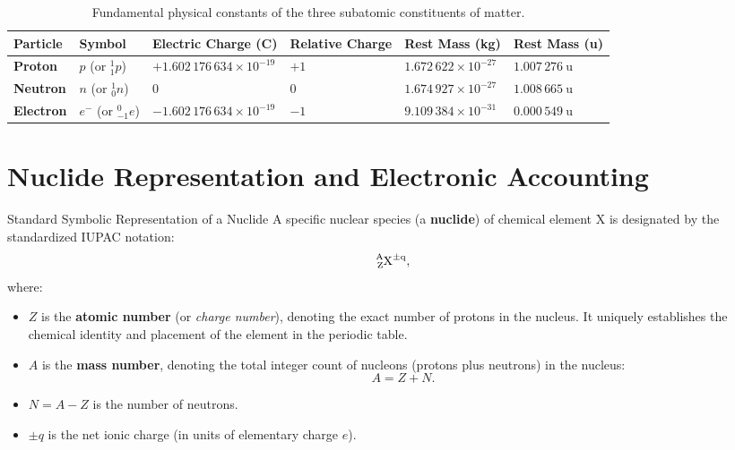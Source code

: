 \begin{table}[htbp]
\centering
\renewcommand{\arraystretch}{1.35}
\begin{tabular}{@{}llllll@{}}
\toprule
\textbf{Particle} & \textbf{Symbol} & \textbf{Electric Charge (C)} & \textbf{Relative Charge} & \textbf{Rest Mass (kg)} & \textbf{Rest Mass (u)} \\
\midrule
\textbf{Proton} & $p$ (or $^1_1p$) & $+1.602\,176\,634 \times 10^{-19}$ & $+1$ & $1.672\,622 \times 10^{-27}$ & $1.007\,276\ \mathrm{u}$ \\
\textbf{Neutron} & $n$ (or $^1_0n$) & $0$ & $0$ & $1.674\,927 \times 10^{-27}$ & $1.008\,665\ \mathrm{u}$ \\
\textbf{Electron} & $e^-$ (or $^0_{-1}e$) & $-1.602\,176\,634 \times 10^{-19}$ & $-1$ & $9.109\,384 \times 10^{-31}$ & $0.000\,549\ \mathrm{u}$ \\
\bottomrule
\end{tabular}
\caption{Fundamental physical constants of the three subatomic constituents of matter.}
\label{tab:subatomic_particles}
\end{table}

\section{Nuclide Representation and Electronic Accounting}

\begin{definitionbox}{Standard Symbolic Representation of a Nuclide}
A specific nuclear species (a \textbf{nuclide}) of chemical element $\mathrm{X}$ is designated by the standardized IUPAC notation:
\begin{equation}
\ce{^{A}_{Z}X^{\pm q}},
\end{equation}
where:
\begin{itemize}[leftmargin=1.5em,itemsep=3pt]
  \item $Z$ is the \textbf{atomic number} (or \emph{charge number}), denoting the exact number of protons in the nucleus. It uniquely establishes the chemical identity and placement of the element in the periodic table.
  \item $A$ is the \textbf{mass number}, denoting the total integer count of nucleons (protons plus neutrons) in the nucleus:
  \begin{equation}
  A = Z + N.
  \end{equation}
  \item $N = A - Z$ is the number of neutrons.
  \item $\pm q$ is the net ionic charge (in units of elementary charge $e$).
\end{itemize}
\end{definitionbox}


